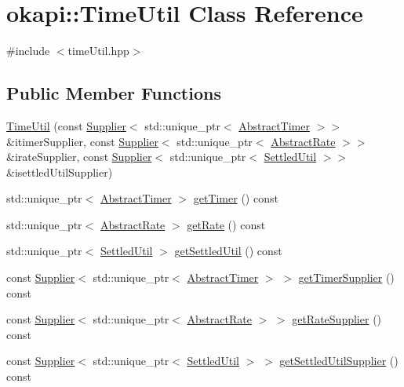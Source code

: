 \hypertarget{classokapi_1_1TimeUtil}{}\section{okapi\+::Time\+Util Class Reference}
\label{classokapi_1_1TimeUtil}


{\ttfamily \#include $<$time\+Util.\+hpp$>$}

\subsection*{Public Member Functions}
\begin{DoxyCompactItemize}
\item 
\mbox{\hyperlink{classokapi_1_1TimeUtil_a5c723190393428cab7621d3f9e60fc85}{Time\+Util}} (const \mbox{\hyperlink{classokapi_1_1Supplier}{Supplier}}$<$ std\+::unique\+\_\+ptr$<$ \mbox{\hyperlink{classokapi_1_1AbstractTimer}{Abstract\+Timer}} $>$$>$ \&itimer\+Supplier, const \mbox{\hyperlink{classokapi_1_1Supplier}{Supplier}}$<$ std\+::unique\+\_\+ptr$<$ \mbox{\hyperlink{classokapi_1_1AbstractRate}{Abstract\+Rate}} $>$$>$ \&irate\+Supplier, const \mbox{\hyperlink{classokapi_1_1Supplier}{Supplier}}$<$ std\+::unique\+\_\+ptr$<$ \mbox{\hyperlink{classokapi_1_1SettledUtil}{Settled\+Util}} $>$$>$ \&isettled\+Util\+Supplier)
\item 
std\+::unique\+\_\+ptr$<$ \mbox{\hyperlink{classokapi_1_1AbstractTimer}{Abstract\+Timer}} $>$ \mbox{\hyperlink{classokapi_1_1TimeUtil_ad0c80313a31b0c43543fb470678f7ace}{get\+Timer}} () const
\item 
std\+::unique\+\_\+ptr$<$ \mbox{\hyperlink{classokapi_1_1AbstractRate}{Abstract\+Rate}} $>$ \mbox{\hyperlink{classokapi_1_1TimeUtil_a71a161d82855bcab94e128106c1646e9}{get\+Rate}} () const
\item 
std\+::unique\+\_\+ptr$<$ \mbox{\hyperlink{classokapi_1_1SettledUtil}{Settled\+Util}} $>$ \mbox{\hyperlink{classokapi_1_1TimeUtil_afd0b2bd0d14401b7284ec08d9fce2e77}{get\+Settled\+Util}} () const
\item 
const \mbox{\hyperlink{classokapi_1_1Supplier}{Supplier}}$<$ std\+::unique\+\_\+ptr$<$ \mbox{\hyperlink{classokapi_1_1AbstractTimer}{Abstract\+Timer}} $>$ $>$ \mbox{\hyperlink{classokapi_1_1TimeUtil_a4d5e56d45f13162ac4b08ff689883315}{get\+Timer\+Supplier}} () const
\item 
const \mbox{\hyperlink{classokapi_1_1Supplier}{Supplier}}$<$ std\+::unique\+\_\+ptr$<$ \mbox{\hyperlink{classokapi_1_1AbstractRate}{Abstract\+Rate}} $>$ $>$ \mbox{\hyperlink{classokapi_1_1TimeUtil_a1baebd40208bd1ed9cc07facd6a1ce8e}{get\+Rate\+Supplier}} () const
\item 
const \mbox{\hyperlink{classokapi_1_1Supplier}{Supplier}}$<$ std\+::unique\+\_\+ptr$<$ \mbox{\hyperlink{classokapi_1_1SettledUtil}{Settled\+Util}} $>$ $>$ \mbox{\hyperlink{classokapi_1_1TimeUtil_a542fb3e832626bdd55a7c7abd471d218}{get\+Settled\+Util\+Supplier}} () const
\end{DoxyCompactItemize}
